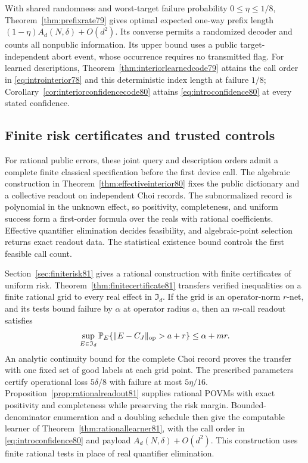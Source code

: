 With shared randomness and worst-target failure probability
$0\le\eta\le1/8$, Theorem~\ref{thm:prefixrate79} gives optimal
expected one-way prefix length
$(1-\eta)A_d(N,\delta)+O(d^2)$.  Its converse permits a
randomized decoder and counts all nonpublic information.  Its
upper bound uses a public target-independent abort event, whose
occurrence requires no transmitted flag.  For learned descriptions,
Theorem~\ref{thm:interiorlearnedcode79} attains the call order
in \eqref{eq:introinterior78} and this deterministic index length
at failure $1/8$; Corollary~\ref{cor:interiorconfidencecode80}
attains \eqref{eq:introconfidence80} at every stated confidence.

\subsection{Finite risk certificates and trusted controls}
For rational public errors, these joint query and description
orders admit a complete finite classical specification before the
first device call.  The algebraic construction in
Theorem~\ref{thm:effectiveinterior80} fixes the public dictionary
and a collective readout on independent Choi records.  The
subnormalized record is polynomial in the unknown effect, so
positivity, completeness, and uniform success form a first-order
formula over the reals with rational coefficients.  Effective
quantifier elimination decides feasibility, and algebraic-point
selection returns exact readout data.  The statistical existence
bound controls the first feasible call count.

Section~\ref{sec:finiterisk81} gives a rational construction with
finite certificates of uniform risk.  Theorem~\ref{thm:finitecertificate81}
transfers verified inequalities on a finite rational grid to every
real effect in $\mathfrak I_d$.  If the grid is an operator-norm
$r$-net, and its tests bound failure by $\alpha$ at operator
radius $a$, then an $m$-call readout satisfies
\[
 \sup_{E\in\mathfrak I_d}
   \mathbb P_E\{\|E-C_J\|_{\rm op}>a+r\}\le\alpha+mr.
\]
An analytic continuity bound for the complete Choi record proves
the transfer with one fixed set of good labels at each grid point.
The prescribed parameters certify operational loss $5\delta/8$
with failure at most $5\eta/16$.
Proposition~\ref{prop:rationalreadout81} supplies rational POVMs
with exact positivity and completeness while preserving the risk
margin.  Bounded-denominator enumeration and a doubling schedule
then give the computable learner of
Theorem~\ref{thm:rationallearner81}, with the call order in
\eqref{eq:introconfidence80} and payload
$A_d(N,\delta)+O(d^2)$.  This construction uses finite rational
tests in place of real quantifier elimination.

